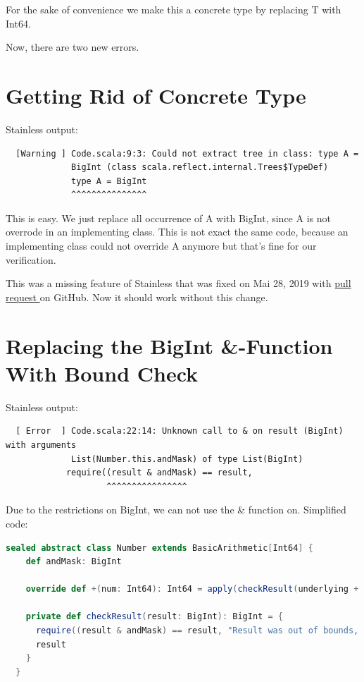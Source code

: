 For the sake of convenience we make this a concrete type by replacing T with Int64.

Now, there are two new errors.


\section{Getting Rid of Concrete Type}

Stainless output:
{\footnotesize\begin{verbatim}
  [Warning ] Code.scala:9:3: Could not extract tree in class: type A =
             BigInt (class scala.reflect.internal.Trees$TypeDef)
             type A = BigInt
             ^^^^^^^^^^^^^^^
\end{verbatim}}

This is easy.
We just replace all occurrence of A with BigInt, since A is not overrode in an implementing class.
This is not exact the same code, because an implementing class could not override A anymore but that's fine for our verification.

This was a missing feature of Stainless that was fixed on Mai 28, 2019 with \href{https://github.com/epfl-lara/stainless/pull/470}{pull request } on GitHub.
Now it should work without this change.


\section{Replacing the BigInt \&-Function With Bound Check}
\label{sec:bound_check}

Stainless output:
{\footnotesize\begin{verbatim}
  [ Error  ] Code.scala:22:14: Unknown call to & on result (BigInt) with arguments
             List(Number.this.andMask) of type List(BigInt)
            require((result & andMask) == result,
                    ^^^^^^^^^^^^^^^^
\end{verbatim}}

Due to the restrictions on BigInt, we can not use the \& function on.
Simplified code:
\begin{lstlisting}[language=scala]
  sealed abstract class Number extends BasicArithmetic[Int64] {
    def andMask: BigInt

    override def +(num: Int64): Int64 = apply(checkResult(underlying + num.underlying))

    private def checkResult(result: BigInt): BigInt = {
      require((result & andMask) == result, "Result was out of bounds, got: " + result)
      result
    }
  }
\end{lstlisting}


